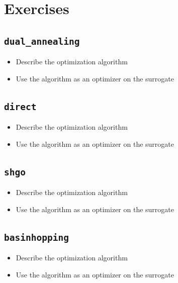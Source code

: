\documentclass[
  letterpaper,
  DIV=11,
  numbers=noendperiod]{scrreprt}
\providecommand{\tightlist}{%
  \setlength{\itemsep}{0pt}\setlength{\parskip}{0pt}}\usepackage{longtable,booktabs,array}
\begin{document}
\hypertarget{exercises-3}{%
\section{Exercises}\label{exercises-3}}

\hypertarget{dual_annealing}{%
\subsection{\texorpdfstring{\texttt{dual\_annealing}}{dual\_annealing}}\label{dual_annealing}}

\begin{itemize}
\tightlist
\item
  Describe the optimization algorithm
\item
  Use the algorithm as an optimizer on the surrogate
\end{itemize}

\hypertarget{direct}{%
\subsection{\texorpdfstring{\texttt{direct}}{direct}}\label{direct}}

\begin{itemize}
\tightlist
\item
  Describe the optimization algorithm
\item
  Use the algorithm as an optimizer on the surrogate
\end{itemize}

\hypertarget{shgo}{%
\subsection{\texorpdfstring{\texttt{shgo}}{shgo}}\label{shgo}}

\begin{itemize}
\tightlist
\item
  Describe the optimization algorithm
\item
  Use the algorithm as an optimizer on the surrogate
\end{itemize}

\hypertarget{basinhopping}{%
\subsection{\texorpdfstring{\texttt{basinhopping}}{basinhopping}}\label{basinhopping}}

\begin{itemize}
\tightlist
\item
  Describe the optimization algorithm
\item
  Use the algorithm as an optimizer on the surrogate
\end{itemize}
\end{document}
